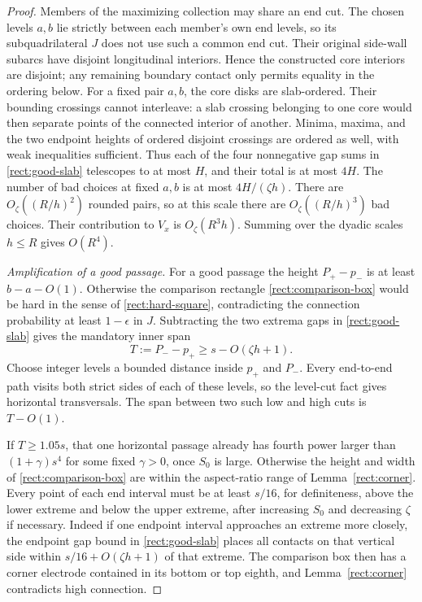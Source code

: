 \begin{proof}
Members of the maximizing collection may share an end cut.  The chosen
levels $a,b$ lie strictly between each member's own end levels, so its
subquadrilateral $J$ does not use such a common end cut.  Their original
side-wall subarcs have disjoint longitudinal interiors.  Hence the
constructed core interiors are disjoint; any remaining boundary contact
only permits equality in the ordering below.
For a fixed pair $a,b$, the core disks are slab-ordered.  Their
bounding crossings cannot interleave: a slab crossing belonging to one
core would then separate points of the connected interior of another.
Minima, maxima, and the two endpoint heights of ordered disjoint
crossings are ordered as well, with weak inequalities sufficient.
Thus each of the four nonnegative gap sums in
\eqref{rect:good-slab} telescopes to at most $H$, and their total is at
most $4H$.  The number of bad choices at fixed $a,b$ is at most
$4H/(\zeta h)$.  There are $O_\zeta((R/h)^2)$ rounded pairs, so at this
scale there are $O_\zeta((R/h)^3)$ bad choices.  Their contribution to
$V_x$ is $O_\zeta(R^3h)$.  Summing over the dyadic scales $h\le R$
gives $O(R^4)$.

\smallskip\noindent
\emph{Amplification of a good passage.}
For a good passage the height $P_+-p_-$ is at least $b-a-O(1)$.
Otherwise the comparison rectangle \eqref{rect:comparison-box} would
be hard in the sense of \eqref{rect:hard-square}, contradicting the
connection probability at least $1-\epsilon$ in $J$.  Subtracting the
two extrema gaps in \eqref{rect:good-slab} gives the mandatory inner span
\begin{equation}
 T:=P_--p_+\ge s-O(\zeta h+1).
 \label{rect:inner-span}
\end{equation}
Choose integer levels a bounded distance inside $p_+$ and $P_-$.
Every end-to-end path visits both strict sides of each of these levels,
so the level-cut fact gives horizontal transversals.  The span between
two such low and high cuts is $T-O(1)$.

If $T\ge1.05s$, that one horizontal passage already has fourth power
larger than $(1+\gamma)s^4$ for some fixed $\gamma>0$, once $S_0$ is
large.  Otherwise the height and width of \eqref{rect:comparison-box}
are within the aspect-ratio range of Lemma~\ref{rect:corner}.  Every
point of each end interval must be at least $s/16$, for definiteness,
above the lower extreme and below the upper extreme, after increasing
$S_0$ and decreasing $\zeta$ if necessary.  Indeed if one endpoint
interval approaches an extreme more closely, the endpoint gap bound
in \eqref{rect:good-slab} places all contacts on that vertical side
within $s/16+O(\zeta h+1)$ of that extreme.  The comparison box then
has a corner electrode contained in its bottom or top eighth, and
Lemma~\ref{rect:corner} contradicts high connection.


\end{proof}
